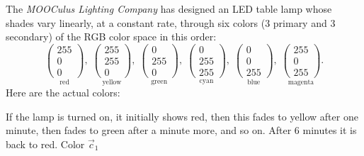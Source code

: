 \documentclass{ximera}
\begin{document}
\begin{example}
  The \textit{MOOCulus Lighting Company} has designed an LED table
  lamp whose shades vary linearly, at a constant rate, through six
  colors ($3$ primary and $3$ secondary) of the RGB color space in
  this order:
    \[
    \underset{\text{red}}{\begin{pmatrix}255\\0\\0\end{pmatrix}},\;
    \underset{\text{yellow}}{\begin{pmatrix}255\\255\\0\end{pmatrix}},\;
    \underset{\text{green}}{\begin{pmatrix}0\\255\\0\end{pmatrix}},\;
    \underset{\text{cyan}}{\begin{pmatrix}0\\255\\255\end{pmatrix}},\;
    \underset{\text{blue}}{\begin{pmatrix}0\\0\\255\end{pmatrix}},\;
    \underset{\text{magenta}}{\begin{pmatrix}255\\0\\255\end{pmatrix}}.
    \]
    Here are the actual colors:
    \begin{center}
    \end{center}
  If the lamp is turned on, it initially shows red, then this fades to
  yellow after one minute, then fades to green after a minute more,
  and so on. After $6$ minutes it is back to red. Color $\vec{c}_1$

\end{example}
\end{document}
